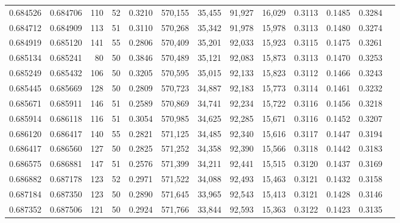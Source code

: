 \begin{tabular}{rrrrrrrrrrrrr}
0.684526 & 0.684706 &   110 &  52 &                                     0.3210 & 570,155 &  35,455 &  91,927 &  16,029 & 0.3113 & 0.1485 & 0.3284 \\
0.684712 & 0.684909 &   113 &  51 &                                     0.3110 & 570,268 &  35,342 &  91,978 &  15,978 & 0.3113 & 0.1480 & 0.3274 \\
0.684919 & 0.685120 &   141 &  55 &                                     0.2806 & 570,409 &  35,201 &  92,033 &  15,923 & 0.3115 & 0.1475 & 0.3261 \\
0.685134 & 0.685241 &    80 &  50 &                                     0.3846 & 570,489 &  35,121 &  92,083 &  15,873 & 0.3113 & 0.1470 & 0.3253 \\
0.685249 & 0.685432 &   106 &  50 &                                     0.3205 & 570,595 &  35,015 &  92,133 &  15,823 & 0.3112 & 0.1466 & 0.3243 \\
0.685445 & 0.685669 &   128 &  50 &                                     0.2809 & 570,723 &  34,887 &  92,183 &  15,773 & 0.3114 & 0.1461 & 0.3232 \\
0.685671 & 0.685911 &   146 &  51 &                                     0.2589 & 570,869 &  34,741 &  92,234 &  15,722 & 0.3116 & 0.1456 & 0.3218 \\
0.685914 & 0.686118 &   116 &  51 &                                     0.3054 & 570,985 &  34,625 &  92,285 &  15,671 & 0.3116 & 0.1452 & 0.3207 \\
0.686120 & 0.686417 &   140 &  55 &                                     0.2821 & 571,125 &  34,485 &  92,340 &  15,616 & 0.3117 & 0.1447 & 0.3194 \\
0.686417 & 0.686560 &   127 &  50 &                                     0.2825 & 571,252 &  34,358 &  92,390 &  15,566 & 0.3118 & 0.1442 & 0.3183 \\
0.686575 & 0.686881 &   147 &  51 &                                     0.2576 & 571,399 &  34,211 &  92,441 &  15,515 & 0.3120 & 0.1437 & 0.3169 \\
0.686882 & 0.687178 &   123 &  52 &                                     0.2971 & 571,522 &  34,088 &  92,493 &  15,463 & 0.3121 & 0.1432 & 0.3158 \\
0.687184 & 0.687350 &   123 &  50 &                                     0.2890 & 571,645 &  33,965 &  92,543 &  15,413 & 0.3121 & 0.1428 & 0.3146 \\
0.687352 & 0.687506 &   121 &  50 &                                     0.2924 & 571,766 &  33,844 &  92,593 &  15,363 & 0.3122 & 0.1423 & 0.3135 \\

\end{tabular}
